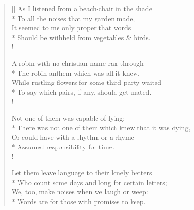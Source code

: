 \documentclass[MAIN]{subfiles}
\begin{document}
\settowidth{\versewidth}{As I listened from a beach-chair in the shade}
\begin{verse}[\versewidth]
As I listened from a beach-chair in the shade\\*
To all the noises that my garden made,\\
It seemed to me only proper that words\\*
Should be withheld from vegetables \& birds.\\!

A robin with no christian name ran through\\*
The robin-anthem which was all it knew,\\
While rustling flowers for some third party waited\\*
To say which pairs, if any, should get mated.\\!

Not one of them was capable of lying;\\*
There was not one of them which knew that it was dying,\\
Or could have with a rhythm or a rhyme\\*
Assumed responsibility for time.\\!

Let them leave language to their lonely betters\\*
Who count some days and long for certain letters;\\
We, too, make noises when we laugh or weep:\\*
Words are for those with promises to keep.
\end{verse}
\end{document}
